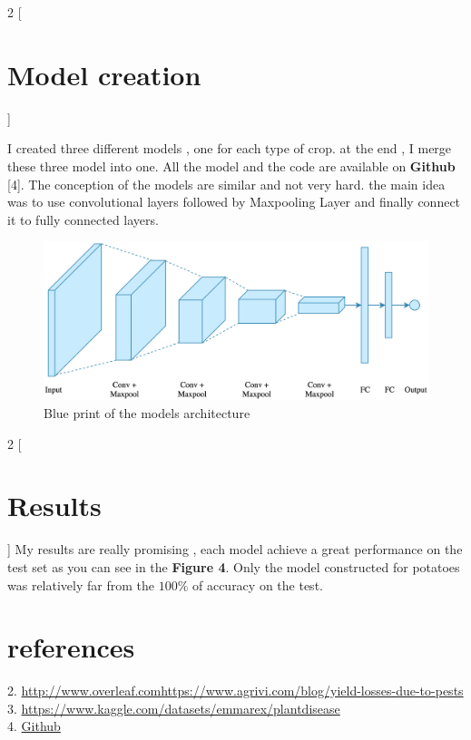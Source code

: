 \documentclass{article}
\begin{document}
\newpage
\begin{multicols}{2}
[
\section{Model creation}
]

I created three different models , one for each type of crop. at the end , I merge these three model into one. All the model and the code are available on \textbf{Github} [4]. The conception of the models are similar and not very hard. the main idea was to use convolutional layers  followed by Maxpooling Layer and finally connect it to fully connected layers.

\end{multicols}

\begin{figure}[H]

\centerline{\includegraphics[scale = 0.25]{img/arch}}
\caption{Blue print of the models architecture }
\end{figure}

\begin{multicols}{2}
[
\section{Results}
]
My results are really promising , each model achieve a great performance on the test set as you can see in the \textbf{Figure 4}. Only the model constructed for potatoes was relatively far from the $100\%$ of accuracy on the test.

\end{multicols}

\section{references}
2. \href{http://www.overleaf.comhttps://www.agrivi.com/blog/yield-losses-due-to-pests}{http://www.overleaf.comhttps://www.agrivi.com/blog/yield-losses-due-to-pests} \\
3. \href{https://www.kaggle.com/datasets/emmarex/plantdisease}{https://www.kaggle.com/datasets/emmarex/plantdisease}\\
4.  \href{}{Github}
\end{document}
